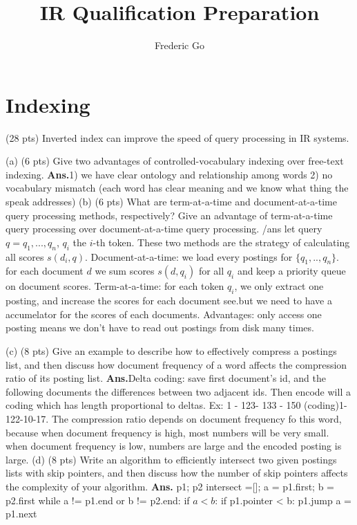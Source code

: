 \documentclass[11pt]{exam}
\title{IR Qualification Preparation}
\author{Frederic Go}
\date{}
\newcommand{\ans}{\textbf{Ans.}}
\begin{document}
\maketitle
\section{Indexing}
\begin{questions}
  \question (28 pts) Inverted index can improve the speed of query processing in IR systems.
  \begin{subparts}
   \subpart (a) (6 pts) Give two advantages of controlled-vocabulary indexing over free-text indexing.
   \ans 1) we have clear ontology and relationship among words 2) no vocabulary 
   mismatch (each word has clear meaning and we know what thing the speak addresses)
   \subpart (b) (6 pts) What are term-at-a-time and document-at-a-time query processing methods,
respectively? Give an advantage of term-at-a-time query processing over
document-at-a-time query processing.
/ans let query $q={q_1, ..., q_n}$, $q_i$ the $i$-th token. These two methods are the strategy of 
calculating all scores $s(d_i, q)$. Document-at-a-time: we load every postings 
for $\{q_1,..,q_n\}$. for each document $d$ we sum scores $s(d, q_i)$ for all $q_i$ and keep a priority queue on document scores.
Term-at-a-time:  for each token $q_i$, we only extract one posting, and increase the scores for each document see.but we need 
to have a accumelator for the scores of each documents. Advantages: only access 
one posting means we don't have to read out postings from disk many times.
 
 \subpart (c) (8 pts) Give an example to describe how to effectively compress a postings list, and
then discuss how document frequency of a word affects the compression ratio of its
posting list.
\ans Delta coding: save first document's id, and the following documents the 
differences between two adjacent ids. Then encode will a coding which has length
proportional to deltas. Ex: 1 - 123- 133 - 150
(coding)1- 122-10-17. The compression ratio depends on document frequency fo 
this word, because when document frequency is high, most numbers will be very 
small. when document frequency is low, numbers are large and the encoded posting is 
large.
 \subpart (d) (8 pts) Write an algorithm to efficiently intersect two given postings lists with skip
pointers, and then discuss how the number of skip pointers affects the complexity of your algorithm.
\ans
 p1; p2 intersect =[];
 a = p1.first; b = p2.first
 while a != p1.end or b != p2.end:
 if $a < b$: 
   if p1.pointer < b: p1.jump
   a = p1.next
   

\end{subparts}
\end{questions}
\end{document}
